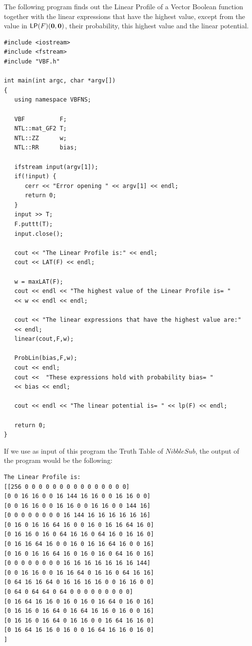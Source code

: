\begin{example}
The following program finds out the Linear Profile of a Vector Boolean function together with the linear expressions that have the highest value, except from the value in $\matr{LP}(F)(\vec{0},\vec{0})$, their probability, this highest value and the linear potential.

\begin{verbatim}
#include <iostream>
#include <fstream>
#include "VBF.h"

int main(int argc, char *argv[])
{
   using namespace VBFNS;

   VBF          F;
   NTL::mat_GF2 T;
   NTL::ZZ      w;
   NTL::RR      bias;

   ifstream input(argv[1]);
   if(!input) {
      cerr << "Error opening " << argv[1] << endl;
      return 0;
   }
   input >> T;
   F.puttt(T);
   input.close();

   cout << "The Linear Profile is:" << endl;
   cout << LAT(F) << endl;

   w = maxLAT(F);
   cout << endl << "The highest value of the Linear Profile is= " 
   << w << endl << endl;

   cout << "The linear expressions that have the highest value are:" 
   << endl;
   linear(cout,F,w);

   ProbLin(bias,F,w);
   cout << endl;
   cout <<  "These expressions hold with probability bias= " 
   << bias << endl;

   cout << endl << "The linear potential is= " << lp(F) << endl;

   return 0;
}
\end{verbatim}

If we use as input of this program the Truth Table of $NibbleSub$, the output of the program would be the following:

\begin{verbatim}
The Linear Profile is:
[[256 0 0 0 0 0 0 0 0 0 0 0 0 0 0 0]
[0 0 16 16 0 0 16 144 16 16 0 0 16 16 0 0]
[0 0 16 16 0 0 16 16 0 0 16 16 0 0 144 16]
[0 0 0 0 0 0 0 0 16 144 16 16 16 16 16 16]
[0 16 0 16 16 64 16 0 0 16 0 16 16 64 16 0]
[0 16 16 0 16 0 64 16 16 0 64 16 0 16 16 0]
[0 16 16 64 16 0 0 16 0 16 16 64 16 0 0 16]
[0 16 0 16 16 64 16 0 16 0 16 0 64 16 0 16]
[0 0 0 0 0 0 0 0 16 16 16 16 16 16 16 144]
[0 0 16 16 0 0 16 16 64 0 16 16 0 64 16 16]
[0 64 16 16 64 0 16 16 16 16 0 0 16 16 0 0]
[0 64 0 64 64 0 64 0 0 0 0 0 0 0 0 0]
[0 16 64 16 16 0 16 0 16 0 16 64 0 16 0 16]
[0 16 16 0 16 64 0 16 64 16 16 0 16 0 0 16]
[0 16 16 0 16 64 0 16 16 0 0 16 64 16 16 0]
[0 16 64 16 16 0 16 0 0 16 64 16 16 0 16 0]
]


\end{verbatim}
\end{example}
